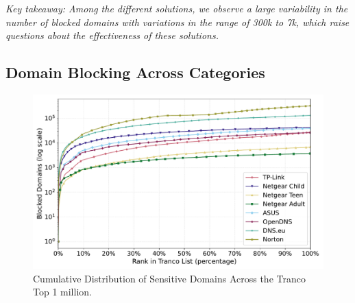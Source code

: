 
\textit{Key takeaway: Among the different solutions, we observe a large variability in the number of blocked domains with variations in the range of 300k to 7k, which raise questions about the effectiveness of these solutions.}

\subsection{Domain Blocking Across Categories} \label{sec:results-categories}



\begin{figure}[t]
    \centering
    \includegraphics[width=0.85\columnwidth]{Images/Results/cdf_blocked_domains_log.pdf}
    \caption{Cumulative Distribution of Sensitive Domains Across the Tranco Top 1 million.}
    \label{fig:cdf_blocked_domains}
\end{figure}


